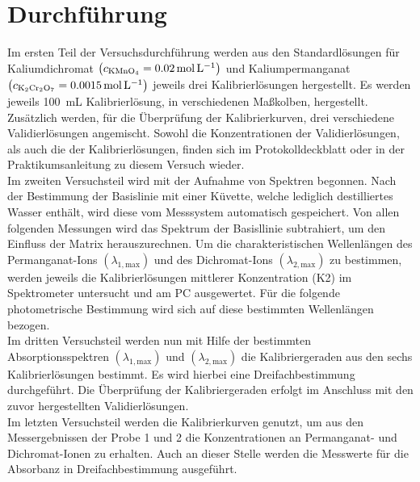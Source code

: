 \newpage
\section{Durchführung}
\label{sec:durchfuerung}
Im ersten Teil der Versuchsdurchführung werden aus den Standardlösungen für Kaliumdichromat $\left(c_\text{\ce{KMnO4}}=\SI{0,02}{\mol \per \liter}\right)$ und Kaliumpermanganat  $\left(c_\text{\ce{K2Cr2O7}}=\SI{0,0015}{\mol \per \liter}\right)$ jeweils drei Kalibrierlösungen hergestellt. Es werden jeweils \SI{100}{\milli \liter} Kalibrierlösung, in verschiedenen Maßkolben, hergestellt. Zusätzlich werden, für die Überprüfung der Kalibrierkurven, drei verschiedene Validierlösungen angemischt. Sowohl die Konzentrationen der Validierlösungen, als auch die der Kalibrierlösungen, finden sich im Protokolldeckblatt oder in der Praktikumsanleitung zu diesem Versuch wieder.\\
Im zweiten Versuchsteil wird mit der Aufnahme von Spektren begonnen. Nach der Bestimmung der Basislinie mit einer Küvette, welche lediglich destilliertes Wasser enthält, wird diese vom Messsystem automatisch gespeichert. Von allen folgenden Messungen wird das Spektrum der Basisllinie subtrahiert, um den Einfluss der Matrix herauszurechnen. \linebreak
Um die charakteristischen Wellenlängen des Permanganat-Ions $(\lambda_{1,\text{max}})$ und des Dichromat-Ions $(\lambda_{2,\text{max}})$ zu bestimmen, werden jeweils die Kalibrierlösungen mittlerer Konzentration (K2) im Spektrometer untersucht und am PC ausgewertet. Für die folgende photometrische Bestimmung wird sich auf diese bestimmten Wellenlängen bezogen.\\
Im dritten Versuchsteil werden nun mit Hilfe der bestimmten Absorptionsspektren $(\lambda_{1,\text{max}})$ und $(\lambda_{2,\text{max}})$ die Kalibriergeraden aus den sechs Kalibrierlösungen bestimmt. Es wird hierbei eine Dreifachbestimmung durchgeführt. Die Überprüfung der Kalibriergeraden erfolgt im Anschluss mit den zuvor hergestellten Validierlösungen.\\
Im letzten Versuchsteil werden die Kalibrierkurven genutzt, um aus den Messergebnissen der Probe 1 und 2 die Konzentrationen an Permanganat- und Dichromat-Ionen zu erhalten. Auch an dieser Stelle werden die Messwerte für die Absorbanz in Dreifachbestimmung ausgeführt.